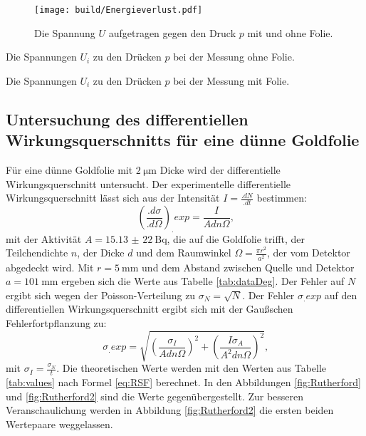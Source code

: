 \begin{figure}
\centering
\texttt{[image: build/Energieverlust.pdf]}
\caption{Die Spannung $U$ aufgetragen gegen den Druck $p$ mit und ohne Folie.}
\label{fig:Foliendicke}
\end{figure}

\begin{table}
	\centering
	\caption{Die Spannungen $U_i$ zu den Drücken $p$ bei der Messung ohne Folie.}
	
	\label{tab:dataOhne}
\end{table}

\begin{table}
	\centering
	\caption{Die Spannungen $U_i$ zu den Drücken $p$ bei der Messung mit Folie.}
	
	\label{tab:dataMit}
\end{table}

\subsection{Untersuchung des differentiellen Wirkungsquerschnitts für eine dünne Goldfolie}

Für eine dünne Goldfolie mit $\SI{2}{\micro\metre}$ Dicke wird der differentielle Wirkungsquerschnitt untersucht.
Der experimentelle differentielle Wirkungsquerschnitt lässt sich aus der Intensität $I=\frac{.dN}{.dt}$ bestimmen:
\begin{equation}
\left(\frac{.d\sigma}{.d\Omega}\right)_.{exp} = \frac{I}{Adn\Omega}\text{,}\label{eq:Rutherford}
\end{equation}
mit der Aktivität $A=\SI{15,13(22)}{\becquerel}$, die auf die Goldfolie trifft, der Teilchendichte $n$, der Dicke $d$ und dem Raumwinkel $\Omega=\frac{\pi r^2}{a^2}$, der vom Detektor abgedeckt wird. Mit $r=\SI{5}{\milli\metre}$ und dem Abstand zwischen Quelle und Detektor $a=\SI{101}{\milli\meter}$ ergeben sich die Werte aus Tabelle \ref{tab:dataDeg}. Der Fehler auf $N$ ergibt sich wegen der Poisson-Verteilung zu $\sigma_N= \sqrt{N}$.
Der Fehler $\sigma_.{exp}$ auf den differentiellen Wirkungsquerschnitt ergibt sich mit der Gaußschen Fehlerfortpflanzung zu:
\begin{equation}
\sigma_.{exp} =\sqrt{\left(\frac{\sigma_I}{Adn\Omega}\right)^2+\left(\frac{I\sigma_A}{A^2dn\Omega}\right)^2} 
\text{,}\label{eq:errorRutherford}
\end{equation}
mit $\sigma_I=\frac{\sigma_N}{t}$.
Die theoretischen Werte werden mit den Werten aus Tabelle \ref{tab:values} nach Formel \eqref{eq:RSF} berechnet. In  den Abbildungen \ref{fig:Rutherford} und \ref{fig:Rutherford2} sind die Werte gegenübergestellt. Zur besseren Veranschaulichung werden in Abbildung \ref{fig:Rutherford2} die ersten beiden Wertepaare weggelassen.\\
 
